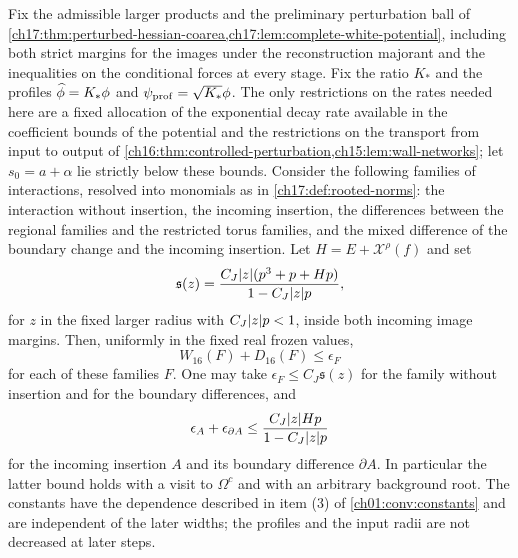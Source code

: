 \begin{lemma}\label{ch17:lem:decorated-white-primitives}
Fix the admissible larger products and the preliminary perturbation ball of \cref{ch17:thm:perturbed-hessian-coarea,ch17:lem:complete-white-potential}, including both strict margins for the images under the reconstruction majorant and the inequalities on the conditional forces at every stage. Fix the ratio $K_*$ and the profiles $\widehat\phi=K_*\phi$ and $\psi_{\mathrm{prof}}=\sqrt{K_*}\phi$. The only restrictions on the rates needed here are a fixed allocation of the exponential decay rate available in the coefficient bounds of the potential and the restrictions on the transport from input to output of \cref{ch16:thm:controlled-perturbation,ch15:lem:wall-networks}; let $s_0=a+\alpha$ lie strictly below these bounds. Consider the following families of interactions, resolved into monomials as in \cref{ch17:def:rooted-norms}: the interaction without insertion, the incoming insertion, the differences between the regional families and the restricted torus families, and the mixed difference of the boundary change and the incoming insertion. Let $H=E+\mathcal X^\rho(f)$ and set
\[
 \mathfrak s(z)=\frac{C_J\lvert z\rvert(p^3+p+Hp)}{1-C_J\lvert z\rvert p},
\]
for $z$ in the fixed larger radius with $C_J\lvert z\rvert p<1$, inside both incoming image margins. Then, uniformly in the fixed real frozen values,
\[
 W_{16}(F)+D_{16}(F)\le\epsilon_F
\]
for each of these families $F$. One may take $\epsilon_F\le C_J\mathfrak s(z)$ for the family without insertion and for the boundary differences, and
\begin{equation}\label{ch17:eq:decorated-inherited-gate}
 \epsilon_A+\epsilon_{\partial A}\le\frac{C_J\lvert z\rvert Hp}{1-C_J\lvert z\rvert p}
\end{equation}
for the incoming insertion $A$ and its boundary difference $\partial A$. In particular the latter bound holds with a visit to $\Omega^c$ and with an arbitrary background root. The constants have the dependence described in item (3) of \cref{ch01:conv:constants} and are independent of the later widths; the profiles and the input radii are not decreased at later steps.
\end{lemma}

